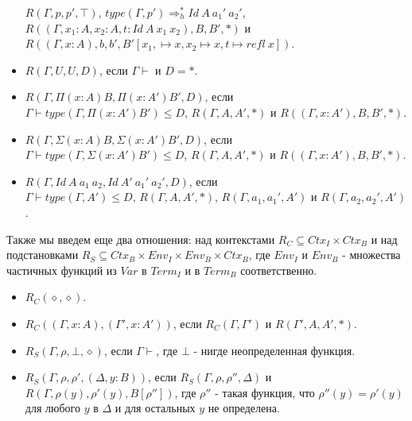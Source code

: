 \documentclass{amsart}
\theoremstyle{definition}
\theoremstyle{remark}
\newcommand{\red}{\Rightarrow}
\numberwithin{figure}{section}
\begin{document}
\begin{itemize}
    $R(\Gamma, p, p', \top)$,
    $type(\Gamma, p') \red_h^* Id\ A\ a_1'\ a_2'$, \\
    $R((\Gamma, x_1 : A, x_2 : A, t : Id\ A\ x_1\ x_2), B, B', *)$ и \\
    $R((\Gamma, x : A), b, b', B'[x_1, \mapsto x, x_2 \mapsto x, t \mapsto refl\ x])$.
\item $R(\Gamma, U, U, D)$, если $\Gamma \vdash$ и $D = *$.
\item $R(\Gamma, \Pi (x : A) B, \Pi (x : A') B', D)$, если \\
    $\Gamma \vdash type(\Gamma, \Pi (x : A') B') \leq D$, $R(\Gamma, A, A', *)$ и $R((\Gamma, x : A'), B, B', *)$.
\item $R(\Gamma, \Sigma (x : A) B, \Sigma (x : A') B', D)$, если \\
    $\Gamma \vdash type(\Gamma, \Sigma (x : A') B') \leq D$, $R(\Gamma, A, A', *)$ и $R((\Gamma, x : A'), B, B', *)$.
\item $R(\Gamma, Id\ A\ a_1\ a_2, Id\ A'\ a_1'\ a_2', D)$, если \\
    $\Gamma \vdash type(\Gamma, A') \leq D$, $R(\Gamma, A, A', *)$, $R(\Gamma, a_1, a_1', A')$ и $R(\Gamma, a_2, a_2', A')$.
\end{itemize}

Также мы введем еще два отношения: над контекстами $R_C \subseteq Ctx_I \times Ctx_B$ и над подстановками $R_S \subseteq Ctx_B \times Env_I \times Env_B \times Ctx_B$,
где $Env_I$ и $Env_B$ - множества частичных функций из $Var$ в $Term_I$ и в $Term_B$ соответственно.
\begin{itemize}
\item $R_C(\diamond, \diamond)$.
\item $R_C((\Gamma, x : A), (\Gamma', x : A'))$, если $R_C(\Gamma, \Gamma')$ и $R(\Gamma', A, A', *)$.
\end{itemize}
\begin{itemize}
\item $R_S(\Gamma, \rho, \bot, \diamond)$, если $\Gamma \vdash$, где $\bot$ - нигде неопределенная функция.
\item $R_S(\Gamma, \rho, \rho', (\Delta, y : B))$, если $R_S(\Gamma, \rho, \rho'', \Delta)$ и $R(\Gamma, \rho(y), \rho'(y), B[\rho''])$,
    где $\rho''$ - такая функция, что $\rho''(y) = \rho'(y)$ для любого $y$ в $\Delta$ и для остальных $y$ не определена.
\end{itemize}
\end{document}

